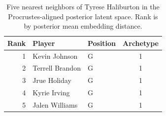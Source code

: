 \begin{table}[htbp]
  \centering\small
  \begin{tabular}{rllc}
    \toprule
    Rank & Player & Position & Archetype \\
    \midrule
    1 & Kevin Johnson & G & 1 \\
    2 & Terrell Brandon & G & 1 \\
    3 & Jrue Holiday & G & 1 \\
    4 & Kyrie Irving & G & 1 \\
    5 & Jalen Williams & G & 1 \\
    \bottomrule
  \end{tabular}
  \caption{Five nearest neighbors of Tyrese Haliburton in the Procrustes-aligned posterior latent space. Rank is by posterior mean embedding distance.}
  \label{tab:Tyrese_Haliburton_neighbors}
\end{table}


